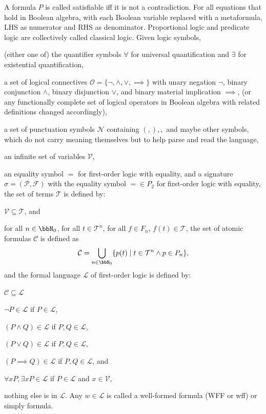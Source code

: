 \documentclass[a4paper,12pt]{article}
\begin{document}
A formula $P$ is called satisfiable iff it is not a contradiction.
For all equations that hold in Boolean algebra, with each Boolean variable replaced with a metaformula, LHS as numerator and RHS as denominator.
Proportional logic and predicate logic are collectively called classical logic.
Given logic symbols,
\bit
\item (either one of) the quantifier symbols $\forall$ for universal quantification and $\exists$ for existential quantification,
\item a set of logical connectives $\mathcal{O}=\{\neg,\land,\lor,\implies\}$ with unary negation $\neg$, binary conjunction $\land$, binary disjunction $\lor$, and binary material implication $\implies$, (or any functionally complete set of logical operators in Boolean algebra with related definitions changed accordingly),
\item a set of punctuation symbols $\mathcal{N}$ containing $(,),,$ and maybe other symbols, which do not carry meaning themselves but to help parse and read the language,
\item an infinite set of variables $\mathcal{V}$,
\item an equality symbol $=$ for first-order logic with equality,
\eit
and a signature $\sigma=(\mathcal{P},\mathcal{F})$ with the equality symbol $=\in P_2$ for first-order logic with equality, the set of terms $\mathcal{T}$ is defined by:
\bit
\item $\mathcal{V}\subseteq\mathcal{T}$, and
\item for all $n\in\bbN_0$, for all $t\in\mathcal{T}^n$, for all $f\in F_n$, $f(t)\in\mathcal{T}$,
\eit
the set of atomic formulas $\mathcal{C}$ is defined as
\[\mathcal{C}=\bigcup_{n\in\bbN_0}\{p(t)\mid t\in\mathcal{T}^n\land p\in P_n\},\]
and the formal language $\mathcal{L}$ of first-order logic is defined by:
\bit
\item $\mathcal{C}\subseteq\mathcal{L}$
\item $\neg P\in\mathcal{L}$ if $P\in\mathcal{L}$,
\item $(P\land Q)\in\mathcal{L}$ if $P,Q\in\mathcal{L}$,
\item $(P\lor Q)\in\mathcal{L}$ if $P,Q\in\mathcal{L}$,
\item $(P\implies Q)\in\mathcal{L}$ if $P,Q\in\mathcal{L}$, and
\item $\forall xP,\exists xP\in\mathcal{L}$ if $P\in\mathcal{L}$ and $x\in\mathcal{V}$,
\item nothing else is in $\mathcal{L}$.
\eit
Any $w\in\mathcal{L}$ is called a well-formed formula (WFF or wff) or simply formula.
\end{document}

